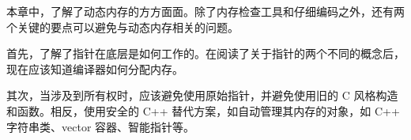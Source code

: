 本章中，了解了动态内存的方方面面。除了内存检查工具和仔细编码之外，还有两个关键的要点可以避免与动态内存相关的问题。

首先，了解了指针在底层是如何工作的。在阅读了关于指针的两个不同的概念后，现在应该知道编译器如何分配内存。

其次，当涉及到所有权时，应该避免使用原始指针，并避免使用旧的 C 风格构造和函数。相反，使用安全的 C++ 替代方案，如自动管理其内存的对象，如 C++ 字符串类、vector 容器、智能指针等。
